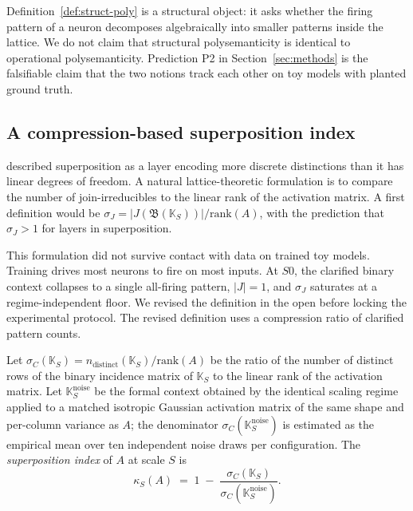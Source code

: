 \documentclass[a4paper,fleqn]{cas-dc}
\newcommand{\K}{\mathbb{K}}
\newcommand{\Lat}{\mathfrak{B}}
\newcommand{\Jirr}{J}
\newcommand{\sigC}{\sigma_C}
\newcommand{\kS}{\kappa_S}
\begin{document}
\noindent Definition~\ref{def:struct-poly} is a structural object: it asks whether the firing pattern of a neuron decomposes algebraically into smaller patterns inside the lattice.
We do not claim that structural polysemanticity is identical to operational polysemanticity.
Prediction P2 in Section~\ref{sec:methods} is the falsifiable claim that the two notions track each other on toy models with planted ground truth.

\subsection{A compression-based superposition index}

\citet{elhage2022superposition} described superposition as a layer encoding more discrete distinctions than it has linear degrees of freedom.
A natural lattice-theoretic formulation is to compare the number of join-irreducibles to the linear rank of the activation matrix.
A first definition would be $\sigma_J = |\Jirr(\Lat(\K_S))| / \mathrm{rank}(A)$, with the prediction that $\sigma_J > 1$ for layers in superposition.

This formulation did not survive contact with data on trained toy models.
Training drives most neurons to fire on most inputs.
At $S0$, the clarified binary context collapses to a single all-firing pattern, $|\Jirr| = 1$, and $\sigma_J$ saturates at a regime-independent floor.
We revised the definition in the open before locking the experimental protocol.
The revised definition uses a compression ratio of clarified pattern counts.

\begin{definition}[Superposition index $\kS$]\label{def:kappa}
Let $\sigC(\K_S) = n_{\mathrm{distinct}}(\K_S) / \mathrm{rank}(A)$ be the ratio of the number of distinct rows of the binary incidence matrix of $\K_S$ to the linear rank of the activation matrix.
Let $\K_S^{\mathrm{noise}}$ be the formal context obtained by the identical scaling regime applied to a matched isotropic Gaussian activation matrix of the same shape and per-column variance as $A$; the denominator $\sigC(\K_S^{\mathrm{noise}})$ is estimated as the empirical mean over ten independent noise draws per configuration.
The \emph{superposition index} of $A$ at scale $S$ is
\begin{equation}
\label{eq:kappa}
\kS(A) \;=\; 1 \;-\; \frac{\sigC(\K_S)}{\sigC(\K_S^{\mathrm{noise}})}.
\end{equation}
\end{definition}
\end{document}
